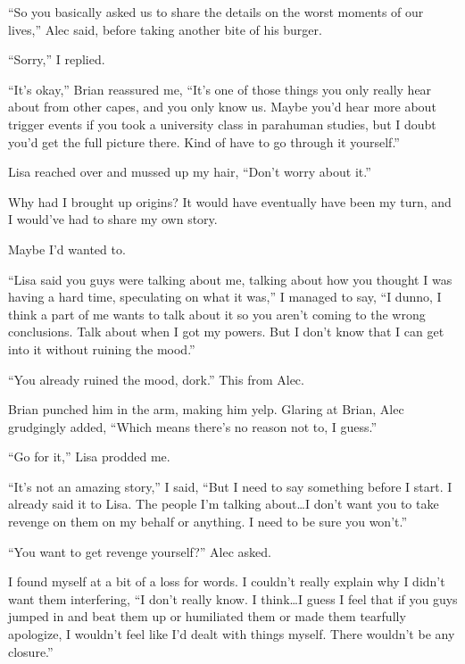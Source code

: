 ``So you basically asked us to share the details on the worst moments of our lives,'' Alec said, before taking another bite of his burger.



``Sorry,'' I replied.



``It's okay,'' Brian reassured me, ``It's one of those things you only really hear about from other capes, and you only know us.  Maybe you'd hear more about trigger events if you took a university class in parahuman studies, but I doubt you'd get the full picture there.  Kind of have to go through it yourself.''



Lisa reached over and mussed up my hair, ``Don't worry about it.''



Why had I brought up origins?  It would have eventually have been my turn, and I would've had to share my own story.



Maybe I'd wanted to.



``Lisa said you guys were talking about me, talking about how you thought I was having a hard time, speculating on what it was,'' I managed to say, ``I dunno, I think a part of me wants to talk about it so you aren't coming to the wrong conclusions.  Talk about when I got my powers.  But I don't know that I can get into it without ruining the mood.''



``You already ruined the mood, dork.''  This from Alec.



Brian punched him in the arm, making him yelp.  Glaring at Brian, Alec grudgingly added, ``Which means there's no reason not to, I guess.''



``Go for it,'' Lisa prodded me.



``It's not an amazing story,'' I said, ``But I need to say something before I start.  I already said it to Lisa.  The people I'm talking about\ldots I don't want you to take revenge on them on my behalf or anything.  I need to be sure you won't.''



``You want to get revenge yourself?'' Alec asked.



I found myself at a bit of a loss for words.  I couldn't really explain why I didn't want them interfering, ``I don't really know.  I think\ldots I guess I feel that if you guys jumped in and beat them up or humiliated them or made them tearfully apologize, I wouldn't feel like I'd dealt with things myself.  There wouldn't be any closure.''



